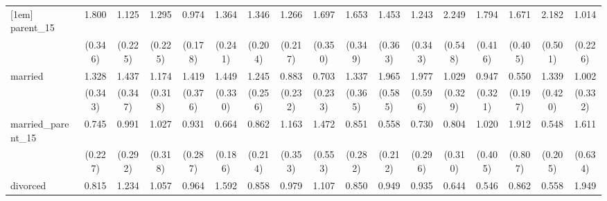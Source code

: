 {\begin{tabular}{l*{16}{c}}
[1em]
parent\_15           &       1.800\sym{**} &       1.125         &       1.295         &       0.974         &       1.364         &       1.346\sym{*}  &       1.266         &       1.697\sym{*}  &       1.653\sym{*}  &       1.453         &       1.243         &       2.249\sym{***}&       1.794\sym{*}  &       1.671\sym{*}  &       2.182\sym{***}&       1.014         \\
                    &     (0.346)         &     (0.225)         &     (0.225)         &     (0.178)         &     (0.241)         &     (0.204)         &     (0.217)         &     (0.350)         &     (0.349)         &     (0.363)         &     (0.343)         &     (0.548)         &     (0.416)         &     (0.405)         &     (0.501)         &     (0.226)         \\
[1em]
married             &       1.328         &       1.437         &       1.174         &       1.419         &       1.449         &       1.245         &       0.883         &       0.703         &       1.337         &       1.965\sym{*}  &       1.977\sym{*}  &       1.029         &       0.947         &       0.550         &       1.339         &       1.002         \\
                    &     (0.343)         &     (0.347)         &     (0.318)         &     (0.376)         &     (0.330)         &     (0.256)         &     (0.232)         &     (0.233)         &     (0.365)         &     (0.585)         &     (0.596)         &     (0.329)         &     (0.321)         &     (0.197)         &     (0.420)         &     (0.332)         \\
[1em]
married\_parent\_15   &       0.745         &       0.991         &       1.027         &       0.931         &       0.664         &       0.862         &       1.163         &       1.472         &       0.851         &       0.558         &       0.730         &       0.804         &       1.020         &       1.912         &       0.548         &       1.611         \\
                    &     (0.227)         &     (0.292)         &     (0.318)         &     (0.287)         &     (0.186)         &     (0.214)         &     (0.353)         &     (0.553)         &     (0.282)         &     (0.212)         &     (0.296)         &     (0.310)         &     (0.405)         &     (0.807)         &     (0.205)         &     (0.634)         \\
[1em]
divorced            &       0.815         &       1.234         &       1.057         &       0.964         &       1.592         &       0.858         &       0.979         &       1.107         &       0.850         &       0.949         &       0.935         &       0.644         &       0.546         &       0.862         &       0.558         &       1.949\sym{*}  \\

\end{tabular}}
